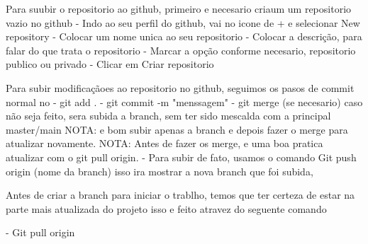 Para suubir o repositorio ao github, primeiro e necesario criaum um repositorio vazio no github
 - Indo ao seu perfil do github, vai no icone de + e selecionar New repository
 - Colocar um nome unica ao seu repositorio
 - Colocar a descrição, para falar do que trata o repositorio
 - Marcar a opção conforme necesario, repositorio publico ou privado
 - Clicar em Criar repositorio

 
 Para subir modificaçãoes ao repositorio no github, seguimos os pasos de commit normal no
    - git add .
    - git commit -m "menssagem"
    - git merge (se necesario) caso não seja feito, sera subida a branch, sem ter sido mescalda com a principal master/main
    NOTA: e bom subir apenas a branch e depois fazer o merge para atualizar novamente.
    NOTA: Antes de fazer os merge, e uma boa pratica atualizar com o git pull origin.
    - Para subir de fato, usamos o comando Git push origin (nome da branch)
    isso ira mostrar a nova branch que foi subida,

Antes de criar a branch para iniciar o trablho, temos que ter certeza de estar na parte
mais atualizada do projeto isso e feito atravez do seguente comando

   - Git pull origin 
